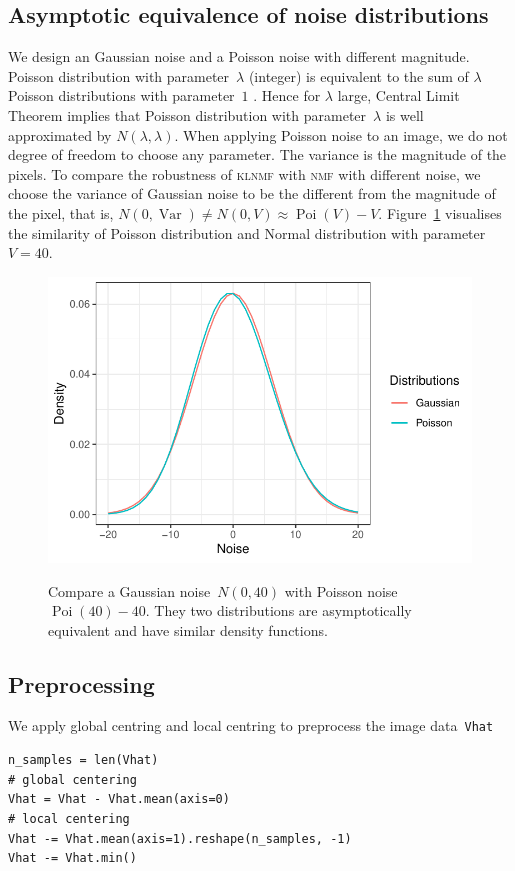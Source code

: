 \subsection{Asymptotic equivalence of noise distributions}
 We design an Gaussian noise and a Poisson noise with different magnitude.
 Poisson distribution with parameter~$\lambda$ (integer) is equivalent to the sum of $\lambda$ Poisson distributions with parameter~$1$ \citep[][p. 45]{Walck:1996cca}.
 Hence for $\lambda$ large, Central Limit Theorem implies that Poisson distribution with parameter~$\lambda$ is well approximated by $N(\lambda,\lambda)$.
 When applying Poisson noise to an image, we do not degree of freedom to choose any parameter.
 The variance is the magnitude of the pixels. To compare the robustness of \textsc{klnmf} with \textsc{nmf} with different noise, we choose the variance of Gaussian noise to be the different from the magnitude of the pixel, that is, $N(0,\operatorname{Var})\neq N(0,V)\approx \operatorname{Poi}(V)-V$.
 Figure~\ref{noise} visualises the similarity of Poisson distribution and Normal distribution with parameter~$V=40$.
\begin{figure}
  \centering
  \includegraphics[scale=1]{resource/noise}\\
  \caption{Compare a Gaussian noise~$N(0,40)$ with Poisson noise $\operatorname{Poi}(40)-40$. They two distributions are asymptotically equivalent and have similar density functions.}\label{noise}
\end{figure}

\subsection{Preprocessing}
We apply global centring and local centring to preprocess the image data~\texttt{Vhat}
\begin{lstlisting}[caption=Centring image data, label=matn1]
n_samples = len(Vhat)
# global centering
Vhat = Vhat - Vhat.mean(axis=0)
# local centering
Vhat -= Vhat.mean(axis=1).reshape(n_samples, -1)
Vhat -= Vhat.min()
\end{lstlisting}
